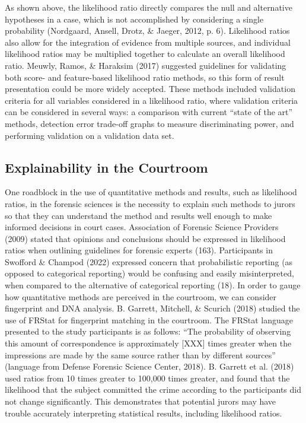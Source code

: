 \documentclass[print]{nuthesis}
\begin{document}
As shown above, the likelihood ratio directly compares the null and alternative hypotheses in a case, which is not accomplished by considering a single probability (Nordgaard, Ansell, Drotz, \& Jaeger, 2012, p. 6).
Likelihood ratios also allow for the integration of evidence from multiple sources, and individual likelihood ratios may be multiplied together to calculate an overall likelihood ratio.
Meuwly, Ramos, \& Haraksim (2017) suggested guidelines for validating both score- and feature-based likelihood ratio methods, so this form of result presentation could be more widely accepted.
These methods included validation criteria for all variables considered in a likelihood ratio, where validation criteria can be considered in several ways: a comparison with current ``state of the art'' methods, detection error trade-off graphs to measure discriminating power, and performing validation on a validation data set.

\hypertarget{explainability-in-the-courtroom}{%
\subsection{Explainability in the Courtroom}\label{explainability-in-the-courtroom}}

One roadblock in the use of quantitative methods and results, such as likelihood ratios, in the forensic sciences is the necessity to explain such methods to jurors so that they can understand the method and results well enough to make informed decisions in court cases.
Association of Forensic Science Providers (2009) stated that opinions and conclusions should be expressed in likelihood ratios when outlining guidelines for forensic experts (163).
Participants in Swofford \& Champod (2022) expressed concern that probabilistic reporting (as opposed to categorical reporting) would be confusing and easily misinterpreted, when compared to the alternative of categorical reporting (18).
In order to gauge how quantitative methods are perceived in the courtroom, we can consider fingerprint and DNA analysis.
B. Garrett, Mitchell, \& Scurich (2018) studied the use of FRStat for fingerprint matching in the courtroom.
The FRStat language presented to the study participants is as follows: ``The probability of observing this amount of correspondence is approximately {[}XXX{]} times greater when the impressions are made by the same source rather than by different sources'' (language from Defense Forensic Science Center, 2018).
B. Garrett et al. (2018) used ratios from 10 times greater to 100,000 times greater, and found that the likelihood that the subject committed the crime according to the participants did not change significantly.
This demonstrates that potential jurors may have trouble accurately interpreting statistical results, including likelihood ratios.
\end{document}
